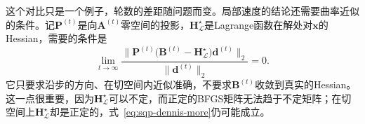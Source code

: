 这个对比只是一个例子，轮数的差距随问题而变。局部速度的结论还需要曲率近似的条件。记$\bm{P}^{(t)}$是向$\bm{A}^{(t)}$零空间的投影，$\bm{H}_{\mathcal{L}}^\star$是Lagrange函数在解处对$\bm{x}$的Hessian，需要的条件是
\begin{equation}
 \lim_{t\to\infty}\frac{\lVert\bm{P}^{(t)}\bigl(\bm{B}^{(t)}-\bm{H}_{\mathcal{L}}^\star\bigr)\bm{d}^{(t)}\rVert_2}{\lVert\bm{d}^{(t)}\rVert_2}=0.
 \label{eq:sqp-dennis-more}
\end{equation}
它只要求沿步的方向、在切空间内近似准确，不要求$\bm{B}^{(t)}$收敛到真实的Hessian。这一点很重要，因为$\bm{H}_{\mathcal{L}}^\star$可以不定，而正定的BFGS矩阵无法趋于不定矩阵；在切空间上$\bm{H}_{\mathcal{L}}^\star$却是正定的，式~\eqref{eq:sqp-dennis-more}仍可能成立。
